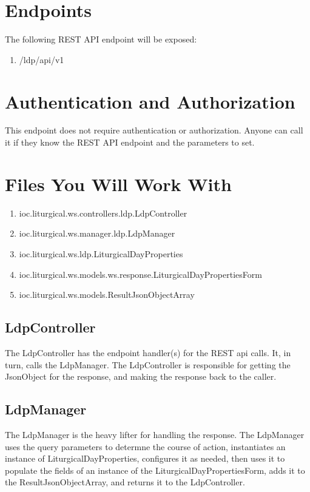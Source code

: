 \documentclass[]{memoir}
\begin{document}
\section{Endpoints}

The following REST API endpoint will be exposed:

\begin{enumerate}
    \item{/ldp/api/v1}
\end{enumerate}

\section{Authentication and Authorization}

This endpoint does not require authentication or authorization.  Anyone can call it if they know the REST API endpoint and the parameters to set.

\section{Files You Will Work With}

\begin{enumerate}
    \item{ioc.liturgical.ws.controllers.ldp.LdpController}
    \item{ioc.liturgical.ws.manager.ldp.LdpManager}
    \item{ioc.liturgical.ws.ldp.LiturgicalDayProperties}
    \item{ioc.liturgical.ws.models.ws.response.LiturgicalDayPropertiesForm}
    \item{ioc.liturgical.ws.models.ResultJsonObjectArray}
\end{enumerate}
    
\subsection{LdpController}

The LdpController has the endpoint handler(s) for the REST api calls.  It, in turn, calls the LdpManager.  The LdpController is responsible for getting the JsonObject for the response, and making the response back to the caller.

\subsection{LdpManager}

The LdpManager is the heavy lifter for handling the response.  The LdpManager uses the query parameters to determne the course of action, instantiates an instance of LiturgicalDayProperties, configures it as needed, then uses it to populate the fields of an instance of the LiturgicalDayPropertiesForm, adds it to the ResultJsonObjectArray, and returns it to the LdpController.
\end{document}
